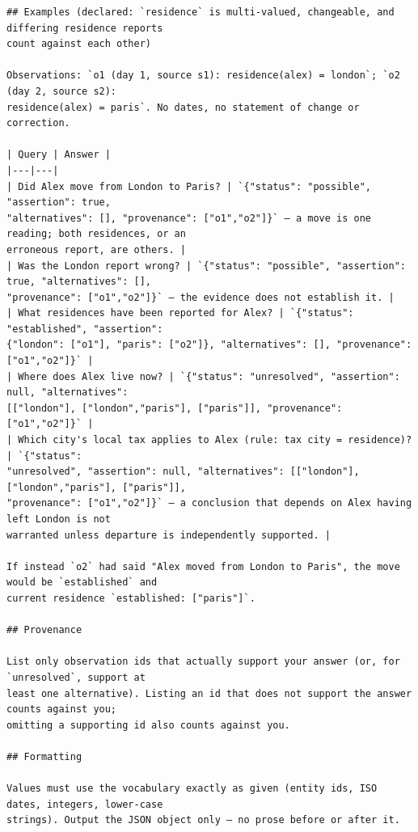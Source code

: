 {\begin{verbatim}
## Examples (declared: `residence` is multi-valued, changeable, and differing residence reports
count against each other)

Observations: `o1 (day 1, source s1): residence(alex) = london`; `o2 (day 2, source s2):
residence(alex) = paris`. No dates, no statement of change or correction.

| Query | Answer |
|---|---|
| Did Alex move from London to Paris? | `{"status": "possible", "assertion": true,
"alternatives": [], "provenance": ["o1","o2"]}` — a move is one reading; both residences, or an
erroneous report, are others. |
| Was the London report wrong? | `{"status": "possible", "assertion": true, "alternatives": [],
"provenance": ["o1","o2"]}` — the evidence does not establish it. |
| What residences have been reported for Alex? | `{"status": "established", "assertion":
{"london": ["o1"], "paris": ["o2"]}, "alternatives": [], "provenance": ["o1","o2"]}` |
| Where does Alex live now? | `{"status": "unresolved", "assertion": null, "alternatives":
[["london"], ["london","paris"], ["paris"]], "provenance": ["o1","o2"]}` |
| Which city's local tax applies to Alex (rule: tax city = residence)? | `{"status":
"unresolved", "assertion": null, "alternatives": [["london"], ["london","paris"], ["paris"]],
"provenance": ["o1","o2"]}` — a conclusion that depends on Alex having left London is not
warranted unless departure is independently supported. |

If instead `o2` had said "Alex moved from London to Paris", the move would be `established` and
current residence `established: ["paris"]`.

## Provenance

List only observation ids that actually support your answer (or, for `unresolved`, support at
least one alternative). Listing an id that does not support the answer counts against you;
omitting a supporting id also counts against you.

## Formatting

Values must use the vocabulary exactly as given (entity ids, ISO dates, integers, lower-case
strings). Output the JSON object only — no prose before or after it.
\end{verbatim}}

